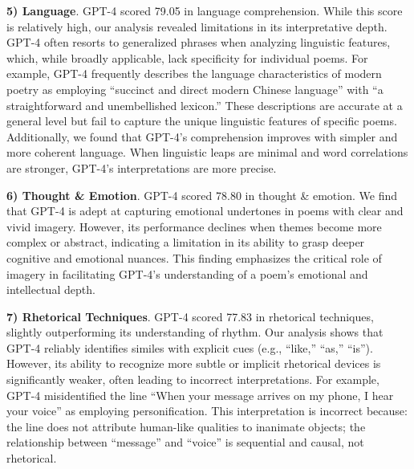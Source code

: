 \documentclass[11pt]{article}
\begin{document}
\textbf{5) Language}. GPT-4 scored 79.05 in language comprehension. While this score is relatively high, our analysis revealed limitations in its interpretative depth. GPT-4 often resorts to generalized phrases when analyzing linguistic features, which, while broadly applicable, lack specificity for individual poems. For example, GPT-4 frequently describes the language characteristics of modern poetry as employing ``succinct and direct modern Chinese language'' with ``a straightforward and unembellished lexicon.'' These descriptions are accurate at a general level but fail to capture the unique linguistic features of specific poems. Additionally, we found that GPT-4's comprehension improves with simpler and more coherent language. When linguistic leaps are minimal and word correlations are stronger, GPT-4's interpretations are more precise.


\textbf{6) Thought \& Emotion}. GPT-4 scored 78.80 in thought \& emotion. We find that GPT-4 is adept at capturing emotional undertones in poems with clear and vivid imagery. However, its performance declines when themes become more complex or abstract, indicating a limitation in its ability to grasp deeper cognitive and emotional nuances. This finding emphasizes the critical role of imagery in facilitating GPT-4's understanding of a poem's emotional and intellectual depth.



\textbf{7) Rhetorical Techniques}. GPT-4 scored 77.83 in rhetorical techniques, slightly outperforming its understanding of rhythm. Our analysis shows that GPT-4 reliably identifies similes with explicit cues (e.g., ``like,'' ``as,'' ``is''). However, its ability to recognize more subtle or implicit rhetorical devices is significantly weaker, often leading to incorrect interpretations. For example, GPT-4 misidentified the line ``When your message arrives on my phone, I hear your voice'' as employing personification. This interpretation is incorrect because: the line does not attribute human-like qualities to inanimate objects; the relationship between ``message'' and ``voice'' is sequential and causal, not rhetorical.

\end{document}
